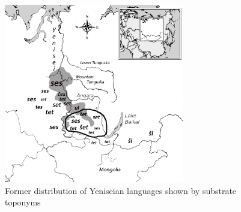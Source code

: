 \begin{figure}
\centering
\includegraphics[width=0.7\textwidth]{figures/vajda-fig3}
\caption{Former distribution of Yeniseian languages shown by substrate toponyms}\label{vajda-fig3}
\end{figure}




